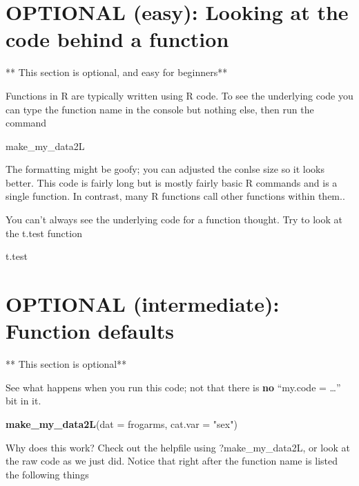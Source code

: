 \documentclass[]{book}
\newenvironment{Shaded}{\begin{snugshade}}{\end{snugshade}}
\newcommand{\KeywordTok}[1]{\textcolor[rgb]{0.13,0.29,0.53}{\textbf{#1}}}
\newcommand{\DataTypeTok}[1]{\textcolor[rgb]{0.13,0.29,0.53}{#1}}
\newcommand{\StringTok}[1]{\textcolor[rgb]{0.31,0.60,0.02}{#1}}
\newcommand{\NormalTok}[1]{#1}
\theoremstyle{definition}
\theoremstyle{definition}
\theoremstyle{definition}
\theoremstyle{remark}
\begin{document}
\section{OPTIONAL (easy): Looking at the code behind a
function}\label{optional-easy-looking-at-the-code-behind-a-function}

** This section is optional, and easy for beginners**

Functions in R are typically written using R code. To see the underlying
code you can type the function name in the console but nothing else,
then run the command

\begin{Shaded}
\begin{Highlighting}[]
\NormalTok{make_my_data2L}
\end{Highlighting}
\end{Shaded}

The formatting might be goofy; you can adjusted the conlse size so it
looks better. This code is fairly long but is mostly fairly basic R
commands and is a single function. In contrast, many R functions call
other functions within them..

You can't always see the underlying code for a function thought. Try to
look at the t.test function

\begin{Shaded}
\begin{Highlighting}[]
\NormalTok{t.test}
\end{Highlighting}
\end{Shaded}

\section{OPTIONAL (intermediate): Function
defaults}\label{optional-intermediate-function-defaults}

** This section is optional**

See what happens when you run this code; not that there is \textbf{no}
``my.code = \ldots{}'' bit in it.

\begin{Shaded}
\begin{Highlighting}[]
\KeywordTok{make_my_data2L}\NormalTok{(}\DataTypeTok{dat =}\NormalTok{ frogarms, }\DataTypeTok{cat.var =} \StringTok{"sex"}\NormalTok{)}
\end{Highlighting}
\end{Shaded}

Why does this work? Check out the helpfile using ?make\_my\_data2L, or
look at the raw code as we just did. Notice that right after the
function name is listed the following things
\end{document}
